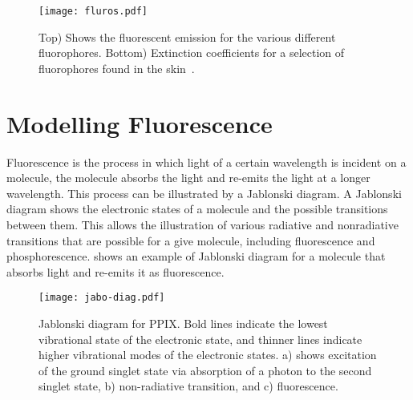

\begin{figure}[!htbp]
  \centering
  \texttt{[image: fluros.pdf]}
  \caption{Top) Shows the fluorescent emission for the various different fluorophores. Bottom) Extinction coefficients for a selection of fluorophores found in the skin~\cite{prahltyro,prahltryto,soltani2019deep,sun2012biomarkers,islam2013ph,evans2013magnetic,von2012fluorescence,dacosta2003molecular}.}
  \label{fig:flurosshow}
\end{figure}
\FloatBarrier

\section{Modelling Fluorescence}

Fluorescence is the process in which light of a certain wavelength is incident on a molecule, the molecule absorbs the light and re-emits the light at a longer wavelength.
This process can be illustrated by a Jablonski diagram.
A Jablonski diagram shows the electronic states of a molecule and the possible transitions between them.
This allows the illustration of various radiative and nonradiative transitions that are possible for a give  molecule, including fluorescence and phosphorescence.
 shows an example of Jablonski diagram for a molecule that absorbs light and re-emits it as fluorescence.

\begin{figure}[!htpb]
	\centering
	\texttt{[image: jabo-diag.pdf]}
	\caption{Jablonski diagram for PPIX. Bold lines indicate the lowest vibrational state of the electronic state, and thinner lines indicate higher vibrational modes of the electronic states. a) shows excitation of the ground singlet state via absorption of a photon to the second singlet state, b) non-radiative transition, and c) fluorescence.}
	\label{fig:Jabo}
\end{figure}

